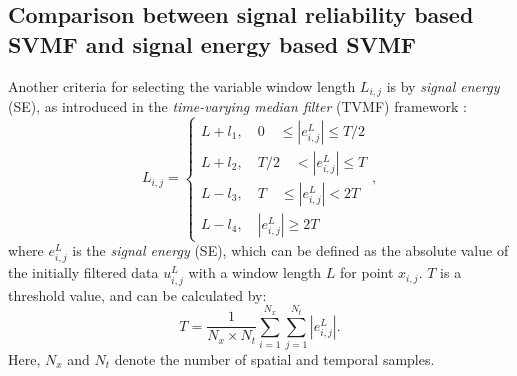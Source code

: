 \subsection{Comparison between signal reliability based SVMF and signal energy based SVMF}
Another criteria for selecting the variable window length $L_{i,j}$ is by \emph{signal energy} (SE), as introduced in the \emph{time-varying median filter} (TVMF) framework \cite[]{liuyang2009tvmf}:
\begin{equation}
\label{eq:svmf3}
L_{i,j}=\left\{\begin{array}{ll}
L+l_1,\quad 0\quad \le |e^L_{i,j}|\le T/2 \\
L+l_2,\quad T/2\quad <|e^L_{i,j}|\le T \\
L-l_3,\quad T \quad \le|e^L_{i,j}| < 2T\\
L-l_4,\quad |e^L_{i,j}| \ge 2T
\end{array}\right.,
\end{equation}
where $e^L_{i,j}$ is the \emph{signal energy} (SE), which can be defined as the absolute value of the initially filtered data $u^L_{i,j}$ with a window length $L$ for point $x_{i,j}$. $T$ is a threshold value, and can be calculated by:
\begin{equation}
\label{eq:threshold}
T=\frac{1}{N_x\times N_t}\sum_{i=1}^{N_x}\sum_{j=1}^{N_t} |e^L_{i,j}|.
\end{equation}
Here, $N_x$ and $N_t$ denote the number of spatial and temporal samples.

